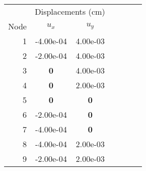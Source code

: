 \begin{tabular}{@{} r cc c ccc @{}}
    \toprule
     & \multicolumn{2}{c}{Displacements (cm)}\\
    \cmidrule{2-3}
    Node & $u_x$ & $u_y$\\
    \midrule

1 & -4.00e-04 & 4.00e-03\\
2 & -2.00e-04 & 4.00e-03\\
3 & \textbf{0} & 4.00e-03\\
4 & \textbf{0} & 2.00e-03\\
5 & \textbf{0} & \textbf{0}\\
6 & -2.00e-04 & \textbf{0}\\
7 & -4.00e-04 & \textbf{0}\\
8 & -4.00e-04 & 2.00e-03\\
9 & -2.00e-04 & 2.00e-03\\

    \bottomrule
\end{tabular}